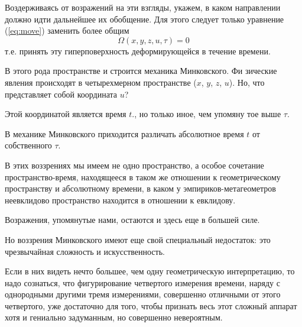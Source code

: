 Воздерживаясь от возражений на эти взгляды, укажем, в каком направлении должно
идти дальнейшее их обобщение. Для этого следует только уравнение
(\ref{eq:move}) заменить более общим 
\begin{equation}
  \Omega(x, y, z, u, \tau) = 0
\end{equation}
т.е. принять эту гиперповерхность деформирующейся в течение времени.
 
В этого рода пространстве и строится механика Минковского. Фи зические явления
происходят в четырехмерном пространстве ($x$, $y$, $z$, $u$). Но, что
представляет собой координата $u$? 

Этой координатой является время $t$., но только иное, чем упомяну­
тое выше $\tau$. 

В механике Минковского приходится различать абсолютное время $t$ от
собственного $\tau$. 

В этих воззрениях мы имеем не одно пространство, а особое сочетание
пространство-время, находящееся в таком же отношении к геометрическому
пространству и абсолютному времени, в каком у эмпириков-метагеометров
неевклидово пространство находится в отношении к евклидову. 

Возражения, упомянутые нами, остаются и здесь еще в большей силе. 

Но воззрения Минковского имеют еще свой специальный недостаток: это
чрезвычайная сложность и искусственность. 

Если в них видеть нечто большее, чем одну геометрическую интерпретацию, то надо
сознаться, что фигурирование четвертого измерения
времени, наряду с однородными другими тремя измерениями, совершенно
отличными от этого четвертого, уже достаточно для того, чтобы признать
весь этот сложный аппарат хотя и гениально задуманным, но совершенно
невероятным. 






